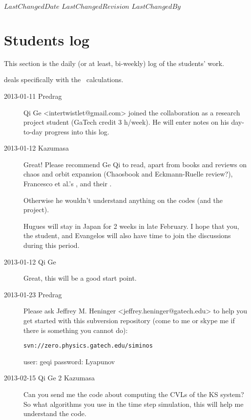 \ifsvnmulti
 {$LastChangedDate$}
 {$LastChangedRevision$} {$LastChangedBy$}
\fi

\chapter{Students log}
\label{c-students}

This section is the daily (or at least, bi-weekly)  log of the students'
work.

 deals specifically with the \KS\ calculations.


\begin{description}

\item[2013-01-11 Predrag] Qi Ge  <intertwistlet@gmail.com> joined the
collaboration as a research project student (GaTech credit 3 h/week).
He will enter notes on his day-to-day progress into this log.

\item[2013-01-12 Kazumasa]
Great! Please recommend Ge Qi to read, apart from books and reviews on
chaos and orbit expansion (Chaosbook and Eckmann-Ruelle review?),
Francesco et al.'s
, and their
.

Otherwise he wouldn't understand anything on the codes (and the project).

Hugues will stay in Japan for 2 weeks in late February. I hope that you,
the student, and Evangelos will also have time to join the discussions
during this period.

\item[2013-01-12 Qi Ge]
Great, this will be a good start point.

\item[2013-01-23 Predrag] Please ask Jeffrey M. Heninger
<jeffrey.heninger@gatech.edu> to help you get started with this
subversion repository (come to me or skype me if there is something you
cannot do):

\texttt{svn://zero.physics.gatech.edu/siminos}

user: geqi  password: Lyapunov

\item[2013-02-15 Qi Ge 2 Kazumasa]
Can you send me the code about computing the CVLs of the KS system? So what algorithms you use in the time step simulation, this will help me understand the code.

\end{description}

\renewcommand{\ssp}{a}
